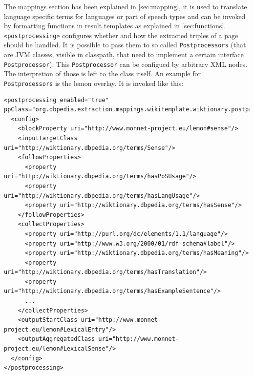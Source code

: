 The mappings section has been explained in \ref{sec:mapping}, it is used to translate language specific terms for languages or part of speech types and can be invoked by formatting functions in result templates as explained in \ref{sec:functions}.\newline
\texttt{<postprocessing>} configures whether and how the extracted triples of a page should be handled. 
It is possible to pass them to so called \texttt{Postprocessors} (that are JVM classes, visible in classpath, that need to implement a certain interface \texttt{Postprocessor}). 
This \texttt{Postprocessor} can be configued by arbitrary XML nodes. 
The interpretion of those is left to the class itself. 
An example for \texttt{Postprocessors} is the lemon overlay. 
It is invoked like this:
\begin{lstlisting}[style=XML]
<postprocessing enabled="true" ppClass="org.dbpedia.extraction.mappings.wikitemplate.wiktionary.postprocessor.LemonOverlay">
  <config>
    <blockProperty uri="http://www.monnet-project.eu/lemon#sense"/>
    <inputTargetClass uri="http://wiktionary.dbpedia.org/terms/Sense"/>
    <followProperties>
      <property uri="http://wiktionary.dbpedia.org/terms/hasPoSUsage"/>
      <property uri="http://wiktionary.dbpedia.org/terms/hasLangUsage"/>
      <property uri="http://wiktionary.dbpedia.org/terms/hasSense"/>
    </followProperties>
    <collectProperties>
      <property uri="http://purl.org/dc/elements/1.1/language"/>
      <property uri="http://www.w3.org/2000/01/rdf-schema#label"/>
      <property uri="http://wiktionary.dbpedia.org/terms/hasMeaning"/>
      <property uri="http://wiktionary.dbpedia.org/terms/hasTranslation"/>
      <property uri="http://wiktionary.dbpedia.org/terms/hasExampleSentence"/>
      ...
    </collectProperties>
    <outputStartClass uri="http://www.monnet-project.eu/lemon#LexicalEntry"/>
    <outputAggregatedClass uri="http://www.monnet-project.eu/lemon#LexicalSense"/>
  </config>
</postprocessing>
\end{lstlisting}

